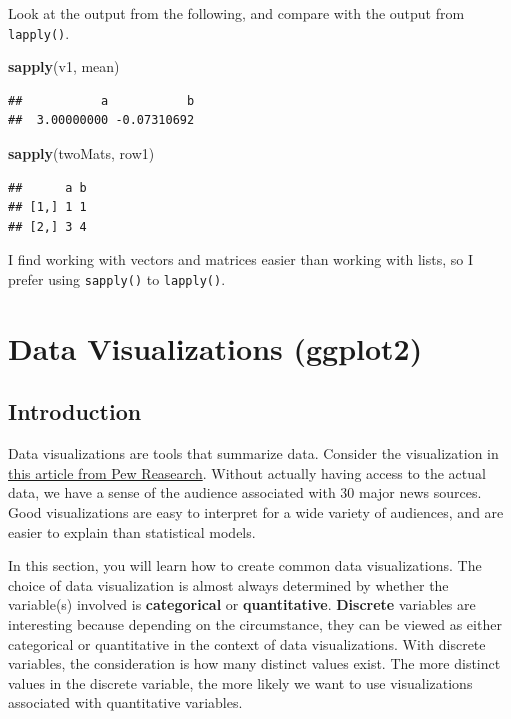 \documentclass[
]{book}
\newenvironment{Shaded}{\begin{snugshade}}{\end{snugshade}}
\newcommand{\FunctionTok}[1]{\textcolor[rgb]{0.13,0.29,0.53}{\textbf{#1}}}
\newcommand{\NormalTok}[1]{#1}
\theoremstyle{definition}
\theoremstyle{definition}
\theoremstyle{definition}
\theoremstyle{definition}
\theoremstyle{remark}
\begin{document}
Look at the output from the following, and compare with the output from \texttt{lapply()}.

\begin{Shaded}
\begin{Highlighting}[]
\FunctionTok{sapply}\NormalTok{(v1, mean)}
\end{Highlighting}
\end{Shaded}

\begin{verbatim}
##           a           b 
##  3.00000000 -0.07310692
\end{verbatim}

\begin{Shaded}
\begin{Highlighting}[]
\FunctionTok{sapply}\NormalTok{(twoMats, row1)}
\end{Highlighting}
\end{Shaded}

\begin{verbatim}
##      a b
## [1,] 1 1
## [2,] 3 4
\end{verbatim}

I find working with vectors and matrices easier than working with lists, so I prefer using \texttt{sapply()} to \texttt{lapply()}.

\hypertarget{ggplot}{%
\chapter{Data Visualizations (ggplot2)}\label{ggplot}}

\hypertarget{introduction}{%
\section{Introduction}\label{introduction}}

Data visualizations are tools that summarize data. Consider the visualization in \href{https://www.pewresearch.org/short-reads/2025/08/18/how-the-audiences-of-30-major-news-sources-differ-in-their-levels-of-education/}{this article from Pew Reasearch}. Without actually having access to the actual data, we have a sense of the audience associated with 30 major news sources. Good visualizations are easy to interpret for a wide variety of audiences, and are easier to explain than statistical models.

In this section, you will learn how to create common data visualizations. The choice of data visualization is almost always determined by whether the variable(s) involved is \textbf{categorical} or \textbf{quantitative}. \textbf{Discrete} variables are interesting because depending on the circumstance, they can be viewed as either categorical or quantitative in the context of data visualizations. With discrete variables, the consideration is how many distinct values exist. The more distinct values in the discrete variable, the more likely we want to use visualizations associated with quantitative variables.
\end{document}
